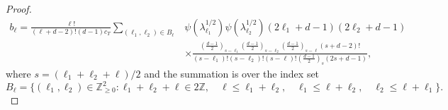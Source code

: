 \documentclass[11pt,a4paper]{article}
\theoremstyle{definition}
\begin{document}
\begin{proof}
\begin{equation}
\begin{split} b_{\ell} = \frac{\ell !}{(\ell+d-2)! (d-1) c_T} \sum_{(\ell_1, \ell_2) \in B_{\ell}} &\psi (\lambda_{\ell_1}^{1/2}) \psi (\lambda_{\ell_2}^{1/2}) (2\ell_1 +d-1)(2\ell_2 +d-1) \\ &\times \frac{\left( \frac{d-1}{2} \right)_{s-\ell_1} \left( \frac{d-1}{2} \right)_{s-\ell_2} \left( \frac{d-1}{2} \right)_{s-\ell} (s+d-2)!}{(s-\ell_1)! (s-\ell_2)! (s-\ell)! \left( \frac{d-1}{2} \right)_s (2s+d-1)} , \end{split}
\end{equation}
where $s=(\ell_1+\ell_2+\ell)/2$ and the summation is over the index set
\[ B_{\ell} = \{ (\ell_1, \ell_2) \in \mathbb{Z}_{\ge 0}^2 : \ell_1+\ell_2+\ell \in 2 \mathbb{Z}, \quad \ell \le \ell_1+\ell_2, \quad \ell_1 \le \ell+\ell_2, \quad \ell_2 \le \ell+\ell_1 \} . \]


\end{proof}
\end{document}
